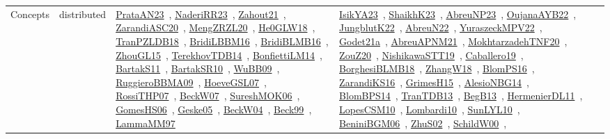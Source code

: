 {\begin{longtable}{lp{3cm}>{\raggedright\arraybackslash}p{6cm}>{\raggedright\arraybackslash}p{6cm}>{\raggedright\arraybackslash}p{8cm}}
Concepts & distributed & \href{works/PrataAN23.pdf}{PrataAN23}~\cite{PrataAN23}, \href{works/NaderiRR23.pdf}{NaderiRR23}~\cite{NaderiRR23}, \href{works/Zahout21.pdf}{Zahout21}~\cite{Zahout21}, \href{works/ZarandiASC20.pdf}{ZarandiASC20}~\cite{ZarandiASC20}, \href{works/MengZRZL20.pdf}{MengZRZL20}~\cite{MengZRZL20}, \href{works/He0GLW18.pdf}{He0GLW18}~\cite{He0GLW18}, \href{works/TranPZLDB18.pdf}{TranPZLDB18}~\cite{TranPZLDB18}, \href{works/BridiLBBM16.pdf}{BridiLBBM16}~\cite{BridiLBBM16}, \href{works/BridiBLMB16.pdf}{BridiBLMB16}~\cite{BridiBLMB16}, \href{works/ZhouGL15.pdf}{ZhouGL15}~\cite{ZhouGL15}, \href{works/TerekhovTDB14.pdf}{TerekhovTDB14}~\cite{TerekhovTDB14}, \href{works/BonfiettiLM14.pdf}{BonfiettiLM14}~\cite{BonfiettiLM14}, \href{works/BartakS11.pdf}{BartakS11}~\cite{BartakS11}, \href{works/BartakSR10.pdf}{BartakSR10}~\cite{BartakSR10}, \href{works/WuBB09.pdf}{WuBB09}~\cite{WuBB09}, \href{works/RuggieroBBMA09.pdf}{RuggieroBBMA09}~\cite{RuggieroBBMA09}, \href{works/HoeveGSL07.pdf}{HoeveGSL07}~\cite{HoeveGSL07}, \href{works/RossiTHP07.pdf}{RossiTHP07}~\cite{RossiTHP07}, \href{works/BeckW07.pdf}{BeckW07}~\cite{BeckW07}, \href{works/SureshMOK06.pdf}{SureshMOK06}~\cite{SureshMOK06}, \href{works/GomesHS06.pdf}{GomesHS06}~\cite{GomesHS06}, \href{works/Geske05.pdf}{Geske05}~\cite{Geske05}, \href{works/BeckW04.pdf}{BeckW04}~\cite{BeckW04}, \href{works/Beck99.pdf}{Beck99}~\cite{Beck99}, \href{works/LammaMM97.pdf}{LammaMM97}~\cite{LammaMM97} & \href{works/IsikYA23.pdf}{IsikYA23}~\cite{IsikYA23}, \href{works/ShaikhK23.pdf}{ShaikhK23}~\cite{ShaikhK23}, \href{works/AbreuNP23.pdf}{AbreuNP23}~\cite{AbreuNP23}, \href{works/OujanaAYB22.pdf}{OujanaAYB22}~\cite{OujanaAYB22}, \href{works/JungblutK22.pdf}{JungblutK22}~\cite{JungblutK22}, \href{works/AbreuN22.pdf}{AbreuN22}~\cite{AbreuN22}, \href{works/YuraszeckMPV22.pdf}{YuraszeckMPV22}~\cite{YuraszeckMPV22}, \href{works/Godet21a.pdf}{Godet21a}~\cite{Godet21a}, \href{works/AbreuAPNM21.pdf}{AbreuAPNM21}~\cite{AbreuAPNM21}, \href{works/MokhtarzadehTNF20.pdf}{MokhtarzadehTNF20}~\cite{MokhtarzadehTNF20}, \href{works/ZouZ20.pdf}{ZouZ20}~\cite{ZouZ20}, \href{works/NishikawaSTT19.pdf}{NishikawaSTT19}~\cite{NishikawaSTT19}, \href{works/Caballero19.pdf}{Caballero19}~\cite{Caballero19}, \href{works/BorghesiBLMB18.pdf}{BorghesiBLMB18}~\cite{BorghesiBLMB18}, \href{works/ZhangW18.pdf}{ZhangW18}~\cite{ZhangW18}, \href{works/BlomPS16.pdf}{BlomPS16}~\cite{BlomPS16}, \href{works/ZarandiKS16.pdf}{ZarandiKS16}~\cite{ZarandiKS16}, \href{works/GrimesH15.pdf}{GrimesH15}~\cite{GrimesH15}, \href{works/AlesioNBG14.pdf}{AlesioNBG14}~\cite{AlesioNBG14}, \href{works/BlomBPS14.pdf}{BlomBPS14}~\cite{BlomBPS14}, \href{works/TranTDB13.pdf}{TranTDB13}~\cite{TranTDB13}, \href{works/BegB13.pdf}{BegB13}~\cite{BegB13}, \href{works/HermenierDL11.pdf}{HermenierDL11}~\cite{HermenierDL11}, \href{works/LopesCSM10.pdf}{LopesCSM10}~\cite{LopesCSM10}, \href{works/Lombardi10.pdf}{Lombardi10}~\cite{Lombardi10}, \href{works/SunLYL10.pdf}{SunLYL10}~\cite{SunLYL10}, \href{works/BeniniBGM06.pdf}{BeniniBGM06}~\cite{BeniniBGM06}, \href{works/ZhuS02.pdf}{ZhuS02}~\cite{ZhuS02}, \href{works/SchildW00.pdf}{SchildW00}~\cite{SchildW00}, 
\end{longtable}}
